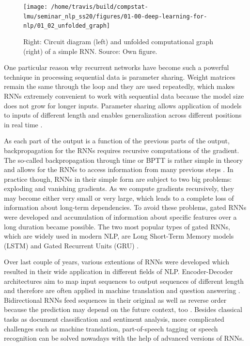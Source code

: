 \documentclass[]{krantz}
\begin{document}
\begin{figure}

{\centering \texttt{[image: /home/travis/build/compstat-lmu/seminar\_nlp\_ss20/figures/01-00-deep-learning-for-nlp/01\_02\_unfolded\_graph]} 

}

\caption{Right: Circuit diagram (left) and unfolded computational graph (right) of a simple RNN. Source: Own figure.}\label{fig:unfolded}
\end{figure}

One particular reason why recurrent networks have become such a powerful technique in processing sequential data is parameter sharing. Weight matrices remain the same through the loop and they are used repeatedly, which makes RNNs extremely convenient to work with sequential data because the model size does not grow for longer inputs. Parameter sharing allows application of models to inputs of different length and enables generalization across different positions in real time \citep{goodfellow2016deep}.

As each part of the output is a function of the previous parts of the output, backpropagation for the RNNs requires recursive computations of the gradient. The so-called backpropagation through time or BPTT is rather simple in theory and allows for the RNNs to access information from many previous steps \citep{boden2002guide}. In practice though, RNNs in their simple form are subject to two big problems: exploding and vanishing gradients. As we compute gradients recursively, they may become either very small or very large, which leads to a complete loss of information about long-term dependencies. To avoid these problems, gated RNNs were developed and accumulation of information about specific features over a long duration became possible. The two most popular types of gated RNNs, which are widely used in modern NLP, are Long Short-Term Memory models (LSTM) and Gated Recurrent Units (GRU) \citep{goodfellow2016deep}.

Over last couple of years, various extentions of RNNs were developed which resulted in their wide application in different fields of NLP. Encoder-Decoder architectures aim to map input sequences to output sequences of different length and therefore are often applied in machine translation and question answering \citep{sutskever2014sequence}. Bidirectional RNNs feed sequences in their original as well as reverse order because the prediction may depend on the future context, too \citep{schuster1997bidirectional}. Besides classical tasks as document classification and sentiment analysis, more complicated challenges such as machine translation, part-of-speech tagging or speech recognition can be solved nowadays with the help of advanced versions of RNNs.
\end{document}
